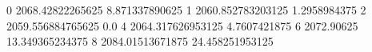 0 2068.42822265625 8.871337890625
1 2060.852783203125 1.2958984375
2 2059.556884765625 0.0
4 2064.317626953125 4.7607421875
6 2072.90625 13.349365234375
8 2084.01513671875 24.458251953125
